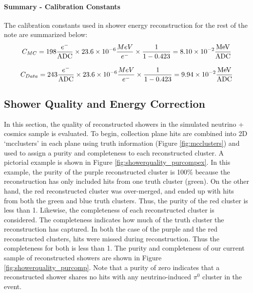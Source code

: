 \paragraph{Summary - Calibration Constants}
The calibration constants used in shower energy reconstruction for the rest of the note are summarized below:
\begin{equation}
  C_{MC} = 198 \frac{e^-}{\rm ADC} \times 23.6 \times 10^{-6} \frac{MeV}{e^-} \times \frac{1}{1-0.423} = 8.10 \times 10^{-2} \frac{\rm MeV}{\rm ADC}
\end{equation}

\begin{equation}
  C_{Data} = 243 \frac{e^-}{\rm ADC} \times 23.6 \times 10^{-6} \frac{MeV}{e^-} \times \frac{1}{1-0.423} = 9.94 \times 10^{-2} \frac{\rm MeV}{\rm ADC}
\end{equation}


\subsection{Shower Quality and Energy Correction}
In this section, the quality of reconstructed showers in the simulated neutrino + cosmics sample is evaluated. To begin, collection plane hits are combined into 2D `mcclusters' in each plane using truth information (Figure \ref{fig:mcclusters}) and used to assign a purity and completeness to each reconstructed cluster. A pictorial example is shown in Figure \ref{fig:showerquality_purcompex}. In this example, the purity of the purple reconstructed cluster is 100\% because the reconstruction has only included hits from one truth cluster (green). On the other hand, the red reconstructed cluster was over-merged, and ended up with hits from both the green and blue truth clusters.  Thus, the purity of the red cluster is less than 1. Likewise, the completeness of each reconstructed cluster is considered. The completeness indicates how much of the truth cluster the reconstruction has captured.  In both the case of the purple and the red reconstructed clusters, hits were missed during reconstruction. Thus the completeness for both is less than 1.  The purity and completeness of our current sample of reconstructed showers are shown in Figure \ref{fig:showerquality_purcomp}. Note that a purity of zero indicates that a reconstructed shower shares no hits with any neutrino-induced $\pi^0$ cluster in the event. 

